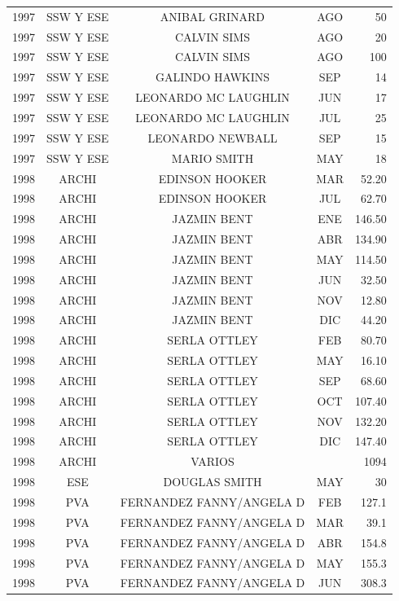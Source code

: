 \documentclass[12pt,]{article}
\begin{document}
\begin{table}[ht]
{\begin{tabular}{lcccr}
  1997 & SSW Y ESE & ANIBAL GRINARD & AGO & 50 \\ 
  1997 & SSW Y ESE & CALVIN SIMS & AGO & 20 \\ 
  1997 & SSW Y ESE & CALVIN SIMS & AGO & 100 \\ 
  1997 & SSW Y ESE & GALINDO HAWKINS & SEP & 14 \\ 
  1997 & SSW Y ESE & LEONARDO MC LAUGHLIN & JUN & 17 \\ 
  1997 & SSW Y ESE & LEONARDO MC LAUGHLIN & JUL & 25 \\ 
  1997 & SSW Y ESE & LEONARDO NEWBALL & SEP & 15 \\ 
  1997 & SSW Y ESE & MARIO SMITH & MAY & 18 \\ 
  1998 & ARCHI & EDINSON HOOKER & MAR & 52.20 \\ 
  1998 & ARCHI & EDINSON HOOKER & JUL & 62.70 \\ 
  1998 & ARCHI & JAZMIN BENT & ENE & 146.50 \\ 
  1998 & ARCHI & JAZMIN BENT & ABR & 134.90 \\ 
  1998 & ARCHI & JAZMIN BENT & MAY & 114.50 \\ 
  1998 & ARCHI & JAZMIN BENT & JUN & 32.50 \\ 
  1998 & ARCHI & JAZMIN BENT & NOV & 12.80 \\ 
  1998 & ARCHI & JAZMIN BENT & DIC & 44.20 \\ 
  1998 & ARCHI & SERLA OTTLEY & FEB & 80.70 \\ 
  1998 & ARCHI & SERLA OTTLEY & MAY & 16.10 \\ 
  1998 & ARCHI & SERLA OTTLEY & SEP & 68.60 \\ 
  1998 & ARCHI & SERLA OTTLEY & OCT & 107.40 \\ 
  1998 & ARCHI & SERLA OTTLEY & NOV & 132.20 \\ 
  1998 & ARCHI & SERLA OTTLEY & DIC & 147.40 \\ 
  1998 & ARCHI & VARIOS &  & 1094 \\ 
  1998 & ESE & DOUGLAS SMITH & MAY & 30 \\ 
  1998 & PVA & FERNANDEZ FANNY/ANGELA D & FEB & 127.1 \\ 
  1998 & PVA & FERNANDEZ FANNY/ANGELA D & MAR & 39.1 \\ 
  1998 & PVA & FERNANDEZ FANNY/ANGELA D & ABR & 154.8 \\ 
  1998 & PVA & FERNANDEZ FANNY/ANGELA D & MAY & 155.3 \\ 
  1998 & PVA & FERNANDEZ FANNY/ANGELA D & JUN & 308.3 \\ 

\end{tabular}}
\end{table}
\end{document}
